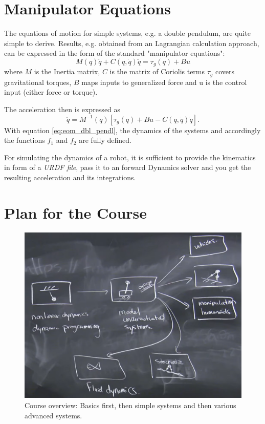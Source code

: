 \section{Manipulator Equations}
The equations of motion for simple systems, e.g. a double pendulum, are quite simple to derive. Results, e.g. obtained from an Lagrangian calculation approach, can be expressed in the form of the standard "manipulator equations":
$$M(q)\ddot{q}+C(q,\dot{q})\ddot{q}=\tau_{g}(q)+Bu$$ 
where $M$ is the Inertia matrix, $C$ is the matrix of Coriolis terms $\tau_{g}$ covers gravitational torques, $B$ maps inputs to generalized force and u is the control input (either force or torque).

The acceleration then is expressed as
\begin{equation}\label{eq:eom_dbl_pendl}
\ddot{q}=M^{-1}(q)[\tau_{g}(q)+Bu-C(q,\dot{q})\dot{q}].
\end{equation}
With equation \ref{eq:eom_dbl_pendl}, the dynamics of the systems and accordingly the functions $f_{1}$ and $f_{2}$ are fully defined.

For simulating the dynamics of a robot, it is sufficient to provide the  kinematics in form of a \textit{URDF file}, pass it to an forward Dynamics solver and you get the resulting acceleration and its integrations.

\section{Plan for the Course}

\begin{figure}[h!]
\begin{center}
  \includegraphics[width=1\textwidth]{Figures/courseOverview.png}
  \caption{Course overview: Basics first, then simple systems and then various advanced systems.}
  \label{fig:overview}
\end{center}
\end{figure}